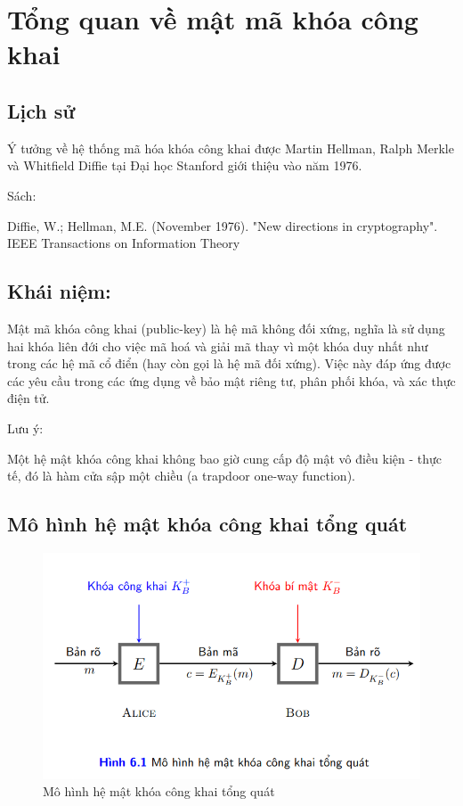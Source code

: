 \documentclass{article}
\begin{document}
\section{Tổng quan về mật mã khóa công khai}
\subsection{Lịch sử}
Ý tưởng về hệ thống mã hóa khóa công khai được Martin Hellman, Ralph Merkle và Whitfield Diffie tại Đại học Stanford giới thiệu vào năm 1976.


Sách:

Diffie, W.; Hellman, M.E. (November 1976). "New directions in cryptography". IEEE Transactions on Information Theory





\subsection{Khái niệm:}


Mật mã khóa công khai (public-key) là hệ mã không đối xứng, nghĩa là sử dụng hai khóa liên đới cho việc mã hoá và giải mã thay vì một khóa duy nhất như trong các hệ mã cổ điển (hay còn gọi là hệ mã đối xứng). Việc này đáp ứng được các yêu cầu trong các ứng dụng về bảo mật riêng tư, phân phối khóa, và xác thực điện tử.

Lưu ý:

Một hệ mật khóa công khai không bao giờ cung cấp độ mật vô điều kiện - thực tế, đó là hàm cửa sập một chiều (a trapdoor one-way function).

\subsection{Mô hình hệ mật khóa công khai tổng quát}

\begin{figure}[H]
    \centering
    \includegraphics[scale = 0.5]{pictures/public.png}
    \caption{Mô hình hệ mật khóa công khai tổng quát}
\end{figure}
\end{document}
